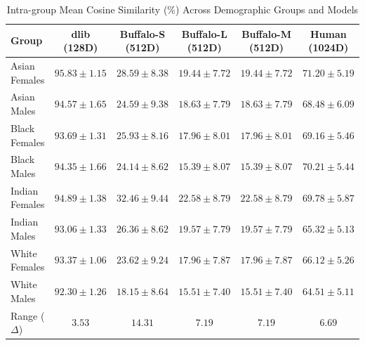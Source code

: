 \begin{table}[htbp]
\centering
\caption{Intra-group Mean Cosine Similarity (\%) Across Demographic Groups and Models}
\label{tab:intra-similarity}
\small
\begin{tabular}{lccccc}
\toprule
Group & dlib (128D) & Buffalo-S (512D) & Buffalo-L (512D) & Buffalo-M (512D) & Human (1024D) \\
\midrule
Asian Females & $95.83\pm1.15$ & $28.59\pm8.38$ & $19.44\pm7.72$ & $19.44\pm7.72$ & $71.20\pm5.19$ \\
Asian Males & $94.57\pm1.65$ & $24.59\pm9.38$ & $18.63\pm7.79$ & $18.63\pm7.79$ & $68.48\pm6.09$ \\
Black Females & $93.69\pm1.31$ & $25.93\pm8.16$ & $17.96\pm8.01$ & $17.96\pm8.01$ & $69.16\pm5.46$ \\
Black Males & $94.35\pm1.66$ & $24.14\pm8.62$ & $15.39\pm8.07$ & $15.39\pm8.07$ & $70.21\pm5.44$ \\
Indian Females & $94.89\pm1.38$ & $32.46\pm9.44$ & $22.58\pm8.79$ & $22.58\pm8.79$ & $69.78\pm5.87$ \\
Indian Males & $93.06\pm1.33$ & $26.36\pm8.62$ & $19.57\pm7.79$ & $19.57\pm7.79$ & $65.32\pm5.13$ \\
White Females & $93.37\pm1.06$ & $23.62\pm9.24$ & $17.96\pm7.87$ & $17.96\pm7.87$ & $66.12\pm5.26$ \\
White Males & $92.30\pm1.26$ & $18.15\pm8.64$ & $15.51\pm7.40$ & $15.51\pm7.40$ & $64.51\pm5.11$ \\
\midrule
Range ($\Delta$) & $3.53$ & $14.31$ & $7.19$ & $7.19$ & $6.69$ \\
\bottomrule
\end{tabular}
\end{table}
